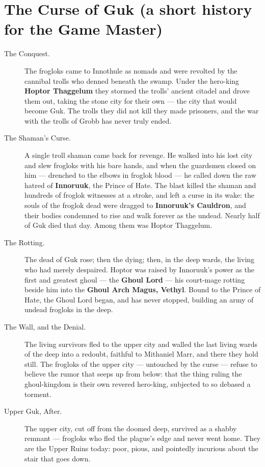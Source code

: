 \documentclass[10pt,twoside]{report}
\begin{document}
\section*{The Curse of Guk (a short history for the Game Master)}
\begin{description}
\item[The Conquest.] The frogloks came to Innothule as nomads and were revolted by the cannibal trolls who denned beneath the swamp. Under the hero-king \textbf{Hoptor Thaggelum} they stormed the trolls' ancient citadel and drove them out, taking the stone city for their own --- the city that would become Guk. The trolls they did not kill they made prisoners, and the war with the trolls of Grobb has never truly ended.
\item[The Shaman's Curse.] A single troll shaman came back for revenge. He walked into his lost city and slew frogloks with his bare hands, and when the guardsmen closed on him --- drenched to the elbows in froglok blood --- he called down the raw hatred of \textbf{Innoruuk}, the Prince of Hate. The blast killed the shaman and hundreds of froglok witnesses at a stroke, and left a curse in its wake: the souls of the froglok dead were dragged to \textbf{Innoruuk's Cauldron}, and their bodies condemned to rise and walk forever as the undead. Nearly half of Guk died that day. Among them was Hoptor Thaggelum.
\item[The Rotting.] The dead of Guk rose; then the dying; then, in the deep wards, the living who had merely despaired. Hoptor was raised by Innoruuk's power as the first and greatest ghoul --- the \textbf{Ghoul Lord} --- his court-mage rotting beside him into the \textbf{Ghoul Arch Magus, Vethyl}. Bound to the Prince of Hate, the Ghoul Lord began, and has never stopped, building an army of undead frogloks in the deep.
\item[The Wall, and the Denial.] The living survivors fled to the upper city and walled the last living wards of the deep into a redoubt, faithful to Mithaniel Marr, and there they hold still. The frogloks of the upper city --- untouched by the curse --- refuse to believe the rumor that seeps up from below: that the thing ruling the ghoul-kingdom is their own revered hero-king, subjected to so debased a torment.
\item[Upper Guk, After.] The upper city, cut off from the doomed deep, survived as a shabby remnant --- frogloks who fled the plague's edge and never went home. They are the Upper Ruins today: poor, pious, and pointedly incurious about the stair that goes down.
\end{description}
\end{document}
